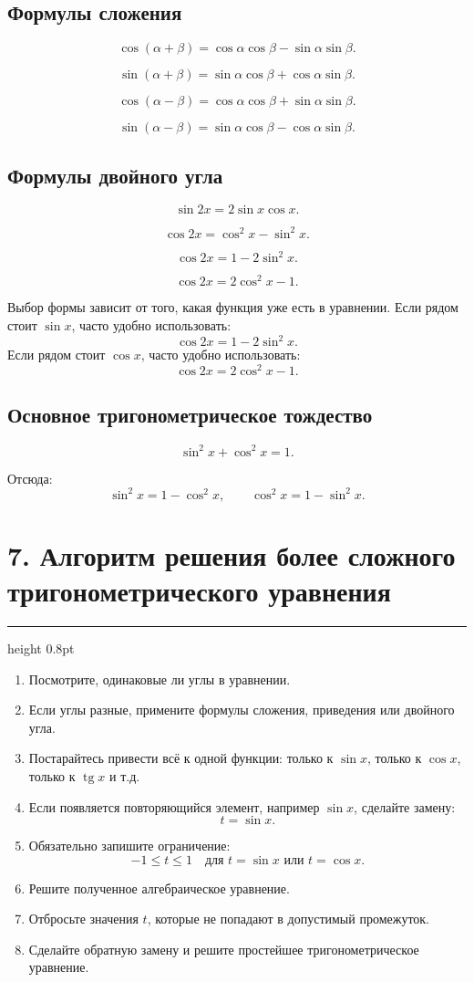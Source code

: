 \documentclass[a4paper,12pt]{article}
\newcommand{\sectionline}{\vspace{0.2em}\textcolor{accent}{\hrule height 0.8pt}\vspace{0.7em}}
\newcommand{\tg}{\mathop{\mathrm{tg}}\nolimits}
\begin{document}
\subsection*{Формулы сложения}

\[
\cos(\alpha+\beta)=\cos\alpha\cos\beta-\sin\alpha\sin\beta.
\]

\[
\sin(\alpha+\beta)=\sin\alpha\cos\beta+\cos\alpha\sin\beta.
\]

\[
\cos(\alpha-\beta)=\cos\alpha\cos\beta+\sin\alpha\sin\beta.
\]

\[
\sin(\alpha-\beta)=\sin\alpha\cos\beta-\cos\alpha\sin\beta.
\]

\subsection*{Формулы двойного угла}

\[
\sin 2x=2\sin x\cos x.
\]

\[
\cos 2x=\cos^2x-\sin^2x.
\]

\[
\cos 2x=1-2\sin^2x.
\]

\[
\cos 2x=2\cos^2x-1.
\]

Выбор формы зависит от того, какая функция уже есть в уравнении. Если рядом стоит \(\sin x\), часто удобно использовать:
\[
\cos 2x=1-2\sin^2x.
\]
Если рядом стоит \(\cos x\), часто удобно использовать:
\[
\cos 2x=2\cos^2x-1.
\]

\subsection*{Основное тригонометрическое тождество}

\[
\sin^2x+\cos^2x=1.
\]

Отсюда:
\[
\sin^2x=1-\cos^2x,
\qquad
\cos^2x=1-\sin^2x.
\]

\section*{7. Алгоритм решения более сложного тригонометрического уравнения}
\sectionline

\begin{enumerate}
    \item Посмотрите, одинаковые ли углы в уравнении.
    \item Если углы разные, примените формулы сложения, приведения или двойного угла.
    \item Постарайтесь привести всё к одной функции: только к \(\sin x\), только к \(\cos x\), только к \(\tg x\) и т.д.
    \item Если появляется повторяющийся элемент, например \(\sin x\), сделайте замену:
    \[
    t=\sin x.
    \]
    \item Обязательно запишите ограничение:
    \[
    -1\le t\le 1
    \quad \text{для } t=\sin x \text{ или } t=\cos x.
    \]
    \item Решите полученное алгебраическое уравнение.
    \item Отбросьте значения \(t\), которые не попадают в допустимый промежуток.
    \item Сделайте обратную замену и решите простейшее тригонометрическое уравнение.
\end{enumerate}
\end{document}
